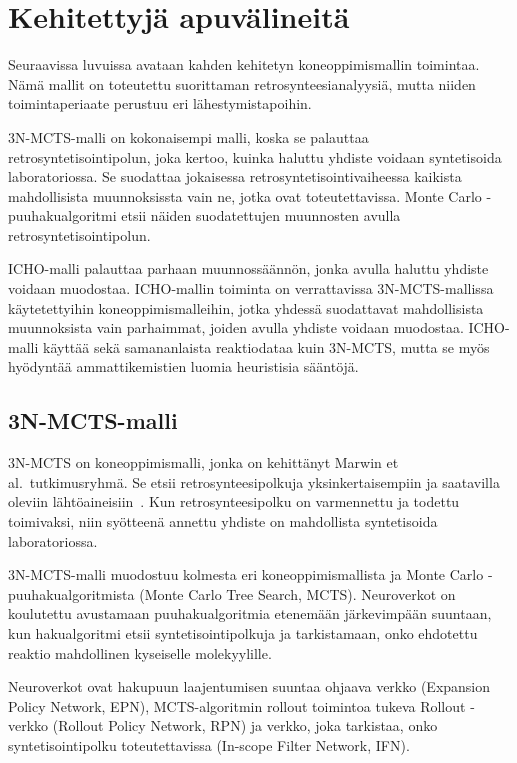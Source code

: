 \documentclass[finnish,twoside,censored,tkt,sw-line]{HYthesisML}
\begin{document}
\section{Kehitettyjä apuvälineitä}

Seuraavissa luvuissa avataan kahden kehitetyn koneoppimismallin toimintaa.
Nämä mallit on toteutettu suorittaman retrosynteesianalyysiä, mutta niiden toimintaperiaate perustuu eri lähestymistapoihin.

3N-MCTS-malli on kokonaisempi malli, koska se palauttaa retrosyntetisointipolun, joka kertoo, kuinka haluttu yhdiste voidaan syntetisoida laboratoriossa.
Se suodattaa jokaisessa retrosyntetisointivaiheessa kaikista mahdollisista muunnoksissta vain ne, jotka ovat toteutettavissa.
Monte Carlo -puuhakualgoritmi etsii näiden suodatettujen muunnosten avulla retrosyntetisointipolun.

ICHO-malli palauttaa parhaan muunnossäännön, jonka avulla haluttu yhdiste voidaan muodostaa.
ICHO-mallin toiminta on verrattavissa 3N-MCTS-mallissa käytetettyihin koneoppimismalleihin, jotka yhdessä suodattavat mahdollisista muunnoksista vain parhaimmat, joiden avulla yhdiste voidaan muodostaa.
ICHO-malli käyttää sekä samananlaista reaktiodataa kuin 3N-MCTS, mutta se myös hyödyntää ammattikemistien luomia heuristisia sääntöjä.

\subsection{3N-MCTS-malli}

3N-MCTS on koneoppimismalli, jonka on kehittänyt Marwin et al.\ tutkimusryhmä.
Se etsii retrosynteesipolkuja yksinkertaisempiin ja saatavilla oleviin lähtöaineisiin~\cite{SeglerMarwinHS2018Pcsw}.
Kun retrosynteesipolku on varmennettu ja todettu toimivaksi, niin syötteenä annettu yhdiste on mahdollista syntetisoida laboratoriossa.

3N-MCTS-malli muodostuu kolmesta eri koneoppimismallista ja Monte Carlo -puuhakualgoritmista (Monte Carlo Tree Search, MCTS).
Neuroverkot on koulutettu avustamaan puuhakualgoritmia etenemään järkevimpään suuntaan, kun hakualgoritmi etsii syntetisointipolkuja ja tarkistamaan, onko ehdotettu reaktio mahdollinen kyseiselle molekyylille.

Neuroverkot ovat hakupuun laajentumisen suuntaa ohjaava verkko (Expansion Policy Network, EPN), MCTS-algoritmin rollout toimintoa tukeva Rollout -verkko (Rollout Policy Network, RPN) ja verkko, joka tarkistaa, onko syntetisointipolku toteutettavissa (In-scope Filter Network, IFN).
\end{document}
